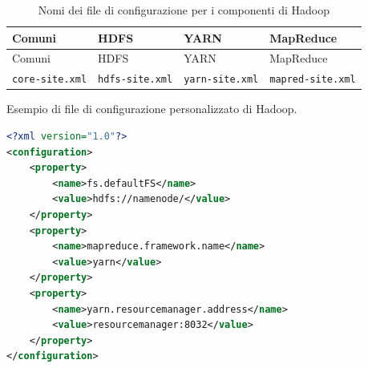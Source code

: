 \documentclass[italian,a4paper, twoside, 12pt]{report}
\begin{document}
\begin{longtable}[]{@{}llll@{}}
\caption{Nomi dei file di configurazione per i componenti di
Hadoop}\tabularnewline
\toprule
\begin{minipage}[b]{0.22\columnwidth}\raggedright\strut
Comuni\strut
\end{minipage} & \begin{minipage}[b]{0.22\columnwidth}\raggedright\strut
HDFS\strut
\end{minipage} & \begin{minipage}[b]{0.22\columnwidth}\raggedright\strut
YARN\strut
\end{minipage} & \begin{minipage}[b]{0.24\columnwidth}\raggedright\strut
MapReduce\strut
\end{minipage}\tabularnewline
\midrule
\endfirsthead
\toprule
\begin{minipage}[b]{0.22\columnwidth}\raggedright\strut
Comuni\strut
\end{minipage} & \begin{minipage}[b]{0.22\columnwidth}\raggedright\strut
HDFS\strut
\end{minipage} & \begin{minipage}[b]{0.22\columnwidth}\raggedright\strut
YARN\strut
\end{minipage} & \begin{minipage}[b]{0.24\columnwidth}\raggedright\strut
MapReduce\strut
\end{minipage}\tabularnewline
\midrule
\endhead
\begin{minipage}[t]{0.22\columnwidth}\raggedright\strut
\lstinline!core-site.xml!\strut
\end{minipage} & \begin{minipage}[t]{0.22\columnwidth}\raggedright\strut
\lstinline!hdfs-site.xml!\strut
\end{minipage} & \begin{minipage}[t]{0.22\columnwidth}\raggedright\strut
\lstinline!yarn-site.xml!\strut
\end{minipage} & \begin{minipage}[t]{0.24\columnwidth}\raggedright\strut
\lstinline!mapred-site.xml!\strut
\end{minipage}\tabularnewline
\bottomrule
\end{longtable}

\begin{codelisting}

\caption{Esempio di file di configurazione personalizzato di Hadoop.}

\begin{lstlisting}[language=XML, label=lst:hadoop-conf-example]
<?xml version="1.0"?>
<configuration>
    <property>
        <name>fs.defaultFS</name>
        <value>hdfs://namenode/</value>
    </property>
    <property>
        <name>mapreduce.framework.name</name>
        <value>yarn</value>
    </property>
    <property>
        <name>yarn.resourcemanager.address</name>
        <value>resourcemanager:8032</value>
    </property>
</configuration>
\end{lstlisting}

\end{codelisting}
\end{document}
